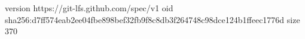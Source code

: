 version https://git-lfs.github.com/spec/v1
oid sha256:d7ff574eab2ee04fbe898bef32fb9f8c8db3f264748c98dce124b1ffeec1776d
size 370
